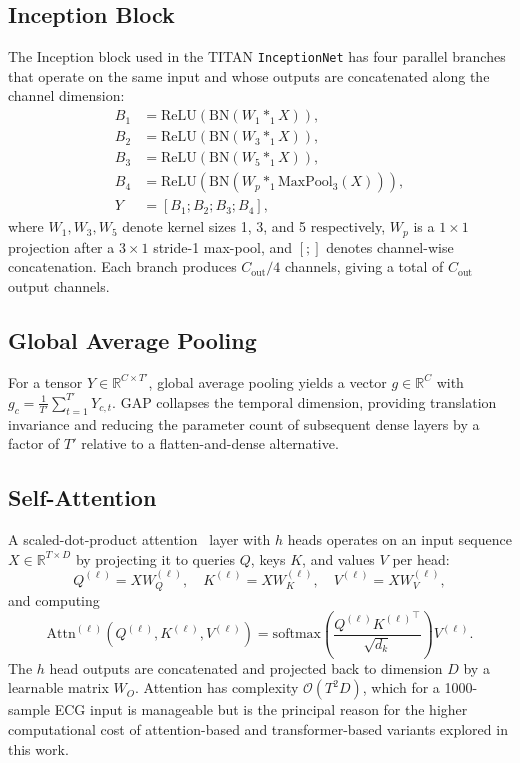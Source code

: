 \subsection{Inception Block}

The Inception block used in the TITAN \texttt{InceptionNet} has four parallel branches that operate on the same input and whose outputs are concatenated along the channel dimension:
\begin{align}
B_1 &= \mathrm{ReLU}(\mathrm{BN}(W_1 *_1 X)), \\
B_2 &= \mathrm{ReLU}(\mathrm{BN}(W_3 *_1 X)), \\
B_3 &= \mathrm{ReLU}(\mathrm{BN}(W_5 *_1 X)), \\
B_4 &= \mathrm{ReLU}(\mathrm{BN}(W_p *_1 \mathrm{MaxPool}_3(X))), \\
Y &= [B_1 ; B_2 ; B_3 ; B_4],
\end{align}
where $W_1, W_3, W_5$ denote kernel sizes 1, 3, and 5 respectively, $W_p$ is a $1\times 1$ projection after a $3\times 1$ stride-1 max-pool, and $[;]$ denotes channel-wise concatenation. Each branch produces $C_{\mathrm{out}}/4$ channels, giving a total of $C_{\mathrm{out}}$ output channels.

\subsection{Global Average Pooling}

For a tensor $Y \in \mathbb{R}^{C \times T'}$, global average pooling yields a vector $g \in \mathbb{R}^{C}$ with $g_c = \frac{1}{T'} \sum_{t=1}^{T'} Y_{c, t}$. GAP collapses the temporal dimension, providing translation invariance and reducing the parameter count of subsequent dense layers by a factor of $T'$ relative to a flatten-and-dense alternative.

\subsection{Self-Attention}

A scaled-dot-product attention~\cite{vaswani2017attention} layer with $h$ heads operates on an input sequence $X \in \mathbb{R}^{T \times D}$ by projecting it to queries $Q$, keys $K$, and values $V$ per head:
\begin{equation}
Q^{(\ell)} = X W^{(\ell)}_Q, \quad K^{(\ell)} = X W^{(\ell)}_K, \quad V^{(\ell)} = X W^{(\ell)}_V,
\end{equation}
and computing
\begin{equation}
\mathrm{Attn}^{(\ell)}(Q^{(\ell)}, K^{(\ell)}, V^{(\ell)}) = \mathrm{softmax}\!\left( \frac{Q^{(\ell)} {K^{(\ell)}}^\top}{\sqrt{d_k}} \right) V^{(\ell)}.
\end{equation}
The $h$ head outputs are concatenated and projected back to dimension $D$ by a learnable matrix $W_O$. Attention has complexity $\mathcal{O}(T^2 D)$, which for a 1000-sample ECG input is manageable but is the principal reason for the higher computational cost of attention-based and transformer-based variants explored in this work.


